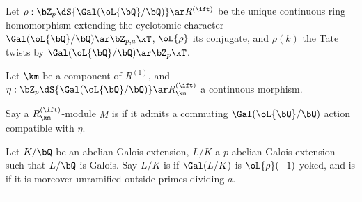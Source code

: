 \documentclass[a4paper, twoside]{article}
\begin{document}
\begin{cmt}
	Let $\rho:\bZ_{p}\dS{\Gal(\oL{\bQ}/\bQ)}\ar R^{(\ift)}$ be the unique continuous ring homomorphism extending the cyclotomic character $\Gal(\oL{\bQ}/\bQ)\ar\bZ_{p,a}\xT$, $\oL{\rho}$ its conjugate, and $\rho(k)$ the Tate twists by $\Gal(\oL{\bQ}/\bQ)\ar\bZ_{p}\xT$.

	\begin{dfn}
		Let $\km$ be a component of $R^{(1)}$, and $\eta:\bZ_{p}\dS{\Gal(\oL{\bQ}/\bQ)}\ar R_{\km}^{(\ift)}$ a continuous morphism.

		Say a $R_{\km}^{(\ift)}$-module $M$ is  if it admits a commuting $\Gal(\oL{\bQ}/\bQ)$ action compatible with $\eta$.
	\end{dfn}

	\begin{dfn}
		Let $K/\bQ$ be an abelian Galois extension, $L/K$ a $p$-abelian Galois extension such that $L/\bQ$ is Galois. Say $L/K$ is  if $\Gal(L/K)$ is $\oL{\rho}(-1)$-yoked, and is  if it is moreover unramified outside primes dividing $a$.
	\end{dfn}
\end{cmt}

\hrule
\end{document}
